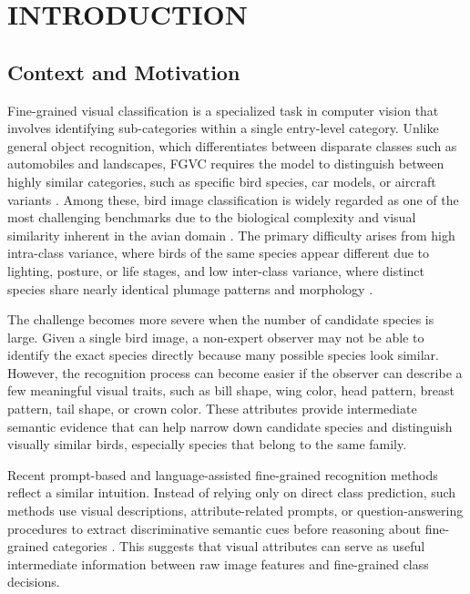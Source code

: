 \chapter{INTRODUCTION}





\section{Context and Motivation}

Fine-grained visual classification is a specialized task in computer vision that involves identifying sub-categories within a single entry-level category. Unlike general object recognition, which differentiates between disparate classes such as automobiles and landscapes, FGVC requires the model to distinguish between highly similar categories, such as specific bird species, car models, or aircraft variants \cite{TransIFC, HierarchicalFeatureAtt}. Among these, bird image classification is widely regarded as one of the most challenging benchmarks due to the biological complexity and visual similarity inherent in the avian domain \cite{article}. The primary difficulty arises from high intra-class variance, where birds of the same species appear different due to lighting, posture, or life stages, and low inter-class variance, where distinct species share nearly identical plumage patterns and morphology \cite{Zhou_2016_CVPR, TransIFC}.

The challenge becomes more severe when the number of candidate species is large. Given a single bird image, a non-expert observer may not be able to identify the exact species directly because many possible species look similar. However, the recognition process can become easier if the observer can describe a few meaningful visual traits, such as bill shape, wing color, head pattern, breast pattern, tail shape, or crown color. These attributes provide intermediate semantic evidence that can help narrow down candidate species and distinguish visually similar birds, especially species that belong to the same family.

Recent prompt-based and language-assisted fine-grained recognition methods reflect a similar intuition. Instead of relying only on direct class prediction, such methods use visual descriptions, attribute-related prompts, or question-answering procedures to extract discriminative semantic cues before reasoning about fine-grained categories \cite{liu2024democratizing}. This suggests that visual attributes can serve as useful intermediate information between raw image features and fine-grained class decisions.

